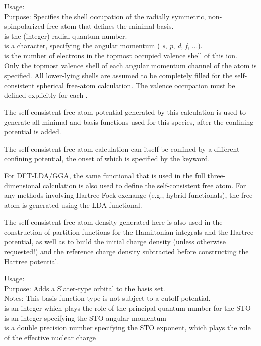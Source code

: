 {
  \noindent
  Usage:   
     \\[1.0ex]
  Purpose: Specifies the shell occupation of the radially symmetric,
    non-spinpolarized free atom that defines the minimal basis. \\[1.0ex]
   is the (integer) radial quantum number. \\
   is a character, specifying the angular momentum (
    \emph{s}, \emph{p}, \emph{d}, \emph{f}, ...). \\
   is the number of electrons in the topmost
    occupied valence shell of this ion. \\
}
Only the topmost valence shell of each angular momentum channel of the
atom is specified. All lower-lying shells are assumed to be completely
filled for the self-consistent spherical free-atom calculation. The
valence occupation must be defined explicitly for each .

The self-consistent free-atom potential generated by this calculation
is used to generate all minimal and 
basis functions used for this species, after the confining potential
is added. 

The self-consistent free-atom calculation can itself be confined by a
different confining potential, the onset of which is specified by the
 keyword.

For DFT-LDA/GGA, the same  functional that is used
in the full three-dimensional calculation is also used to define the
self-consistent free atom. For any methods involving Hartree-Fock
exchange (e.g., hybrid functionals), the free atom is generated using
the  LDA functional.

The self-consistent free atom density generated here is also used in
the construction of partition functions for the Hamiltonian integrals
and the Hartree potential, as well as to build the initial charge
density (unless otherwise requested!) and the reference charge density
subtracted before constructing the Hartree potential.

{
  \noindent
  Usage:    
    \\[1.0ex]
  Purpose: Adds a Slater-type orbital to the basis set. \\[1.0ex]
  Notes: This basis function type is not subject to a cutoff potential. \\[1.0ex]
   is an integer which plays the role of the principal quantum number for the STO\\
   is an integer specifying the STO angular momentum \\
   is a double precision number specifying the STO exponent, which plays the role of the effective nuclear charge\\
}

